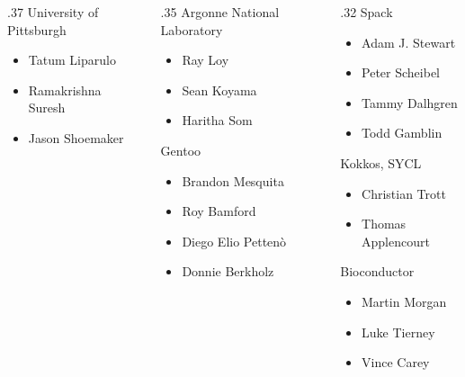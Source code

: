 \documentclass[
aspectratio=169,
xcolor={usenames}
]{beamer}
\begin{document}
{\begin{frame}
\begin{columns}[T]
\begin{column}{.37\framewidth}
      University of Pittsburgh
      \begin{itemize}
      \item Tatum Liparulo
      \item Ramakrishna Suresh
      \item Jason Shoemaker
      \end{itemize}
    \end{column}
    \begin{column}{.35\framewidth}
      \vspace{3.5\baselineskip}
      Argonne National Laboratory
      \begin{itemize}
      \item Ray Loy
      \item Sean Koyama
      \item Haritha Som
      \end{itemize}
      Gentoo
      \begin{itemize}
      \item Brandon Mesquita
      \item Roy Bamford
      \item Diego Elio Petten\`o
      \item Donnie Berkholz
      \end{itemize}
    \end{column}
    \begin{column}{.32\framewidth}
      Spack
      \begin{itemize}
      \item Adam J. Stewart
      \item Peter Scheibel
      \item Tammy Dalhgren
      \item Todd Gamblin
      \end{itemize}

      Kokkos, SYCL
      \begin{itemize}
      \item Christian Trott
      \item Thomas Applencourt
      \end{itemize}

      Bioconductor
      \begin{itemize}
      \item Martin Morgan
      \item Luke Tierney
      \item Vince Carey
      \end{itemize}
    \end{column}
  \end{columns}
\end{frame}
}
\end{document}
